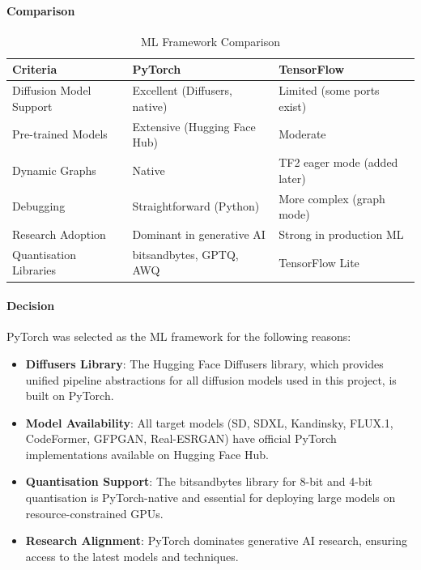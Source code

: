 \documentclass[12pt,a4paper]{report}
\begin{document}
\paragraph{Comparison}

\begin{table}[H]
\centering
\caption{ML Framework Comparison}
\label{tab:ml_framework}
\renewcommand{\arraystretch}{1.3}
\begin{tabular}{|p{4cm}|p{4.5cm}|p{4.5cm}|}
\hline
\textbf{Criteria} & \textbf{PyTorch} & \textbf{TensorFlow} \\
\hline
Diffusion Model Support & Excellent (Diffusers, native) & Limited (some ports exist) \\
\hline
Pre-trained Models & Extensive (Hugging Face Hub) & Moderate \\
\hline
Dynamic Graphs & Native & TF2 eager mode (added later) \\
\hline
Debugging & Straightforward (Python) & More complex (graph mode) \\
\hline
Research Adoption & Dominant in generative AI & Strong in production ML \\
\hline
Quantisation Libraries & bitsandbytes, GPTQ, AWQ & TensorFlow Lite \\
\hline
\end{tabular}
\end{table}

\paragraph{Decision}

PyTorch was selected as the ML framework for the following reasons:
\begin{itemize}
    \item \textbf{Diffusers Library}: The Hugging Face Diffusers library, which provides unified pipeline abstractions for all diffusion models used in this project, is built on PyTorch.
    \item \textbf{Model Availability}: All target models (SD, SDXL, Kandinsky, FLUX.1, CodeFormer, GFPGAN, Real-ESRGAN) have official PyTorch implementations available on Hugging Face Hub.
    \item \textbf{Quantisation Support}: The bitsandbytes library for 8-bit and 4-bit quantisation is PyTorch-native and essential for deploying large models on resource-constrained GPUs.
    \item \textbf{Research Alignment}: PyTorch dominates generative AI research, ensuring access to the latest models and techniques.
\end{itemize}
\end{document}
